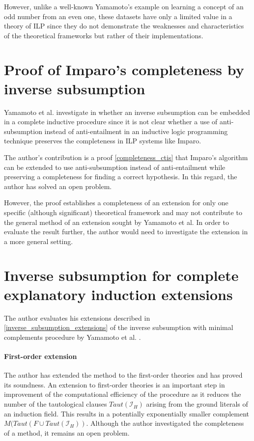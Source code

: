 However, unlike a well-known Yamamoto's example \cite{yamamoto1997hypotheses} on learning a concept of an odd number from an even one, these datasets have only a limited value in a theory of ILP since they do not demonstrate the weaknesses and characteristics of the theoretical frameworks but rather of their implementations. 

\section{Proof of Imparo's completeness by inverse subsumption}
Yamamoto et al. investigate in \cite{yamamoto2012inverse} whether an inverse subsumption can be embedded in a complete inductive procedure since it is not clear whether a use of anti-subsumption instead of anti-entailment in an inductive logic programming technique preserves the completeness in ILP systems like Imparo.

The author's contribution is a proof \ref{completeness_ctis} that Imparo's algorithm can be extended to use anti-subsumption instead of anti-entailment while preserving a completeness for finding a correct hypothesis. In this regard, the author has solved an open problem.

However, the proof establishes a completeness of an extension for only one specific (although significant) theoretical framework and may not contribute to the general method of an extension sought by Yamamoto et al. In order to evaluate the result further, the author would need to investigate the extension in a more general setting.

\section{Inverse subsumption for complete explanatory induction extensions}
The author evaluates his extensions described in \ref{inverse_subsumption_extensions} of the inverse subsumption with minimal complements procedure by Yamamoto et al. \cite{yamamoto2012inverse}.

\paragraph{First-order extension}\label{evaluation_first_order_extension}
The author has extended the method to the first-order theories and has proved its soundness. An extension to first-order theories is an important step in improvement of the computational efficiency of the procedure as it reduces the number of the tautological clauses $Taut(\mathcal{I}_H)$ arising from the ground literals of an induction field. This results in a potentially exponentially smaller complement $M(Taut(F \cup Taut(\mathcal{I}_H))$. Although the author investigated the completeness of a method, it remains an open problem.

